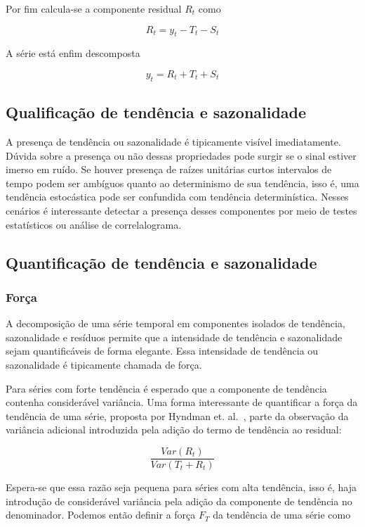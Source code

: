 Por fim calcula-se a componente residual $R_t$ como

$$ R_t = y_t - T_t - S_t $$

A série está enfim descomposta

$$ y_t = R_t + T_t + S_t $$

\subsection{Qualificação de tendência e sazonalidade}

A presença de tendência ou sazonalidade é tipicamente visível imediatamente.
Dúvida sobre a presença ou não dessas propriedades pode surgir se o sinal
estiver imerso em ruído. Se houver presença de raízes unitárias curtos
intervalos de tempo podem ser ambíguos quanto ao determinismo de sua tendência,
isso é, uma tendência estocástica pode ser confundida com tendência
determinística. Nesses cenários é interessante detectar a presença desses
componentes por meio de testes estatísticos ou análise de correlalograma.

\subsection{Quantificação de tendência e sazonalidade}

\subsubsection{Força}

A decomposição de uma série temporal em componentes isolados de tendência,
sazonalidade e resíduos permite que a intensidade de tendência e sazonalidade
sejam quantificáveis de forma elegante. Essa intensidade de tendência ou
sazonalidade é tipicamente chamada de força.

Para séries com forte tendência é esperado que a componente de tendência
contenha considerável variância. Uma forma interessante de quantificar a força
da tendência de uma série, proposta por Hyndman et. al.~\cite{athana}, parte
da observação da variância adicional introduzida pela adição do termo de
tendência ao residual:

$$ \frac{Var(R_t)}{Var(T_t + R_t)} $$

Espera-se que essa razão seja pequena para séries com alta tendência, isso é,
haja introdução de considerável variância pela adição da componente de
tendência no denominador. Podemos então definir a força $F_T$ da tendência de
uma série como

